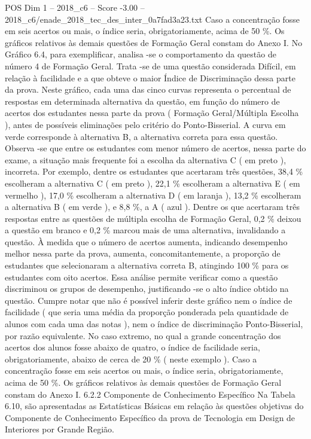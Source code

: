 \begin{textsample}{POS Dim 1 – 2018\_c6 – Score -3.00 – 2018\_c6/enade\_2018\_tec\_des\_inter\_0a7fad3a23.txt}
Caso a concentração fosse em seis acertos ou mais, o índice seria, obrigatoriamente, acima de 50 \%.
Os gráficos relativos às demais questões de Formação Geral constam do Anexo I.
No Gráfico 6.4, para exemplificar, analisa -se o comportamento da questão de número 4 de Formação Geral.
Trata -se de uma questão considerada Difícil, em relação à facilidade e a que obteve o maior Índice de Discriminação dessa parte da prova.
Neste gráfico, cada uma das cinco curvas representa o percentual de respostas em determinada alternativa da questão, em função do número de acertos dos estudantes nessa parte da prova ( Formação Geral/Múltipla Escolha ), antes de possíveis eliminações pelo critério do Ponto-Bisserial.
A curva em verde corresponde à alternativa B, a alternativa correta para essa questão.
Observa -se que entre os estudantes com menor número de acertos, nessa parte do exame, a situação mais frequente foi a escolha da alternativa C ( em preto ), incorreta.
Por exemplo, dentre os estudantes que acertaram três questões, 38,4 \% escolheram a alternativa C ( em preto ), 22,1 \% escolheram a alternativa E ( em vermelho ), 17,0 \% escolheram a alternativa D ( em laranja ), 13,2 \% escolheram a alternativa B ( em verde ), e 8,8 \%, a A ( azul ).
Dentre os que acertaram três respostas entre as questões de múltipla escolha de Formação Geral, 0,2 \% deixou a questão em branco e 0,2 \% marcou mais de uma alternativa, invalidando a questão.
À medida que o número de acertos aumenta, indicando desempenho melhor nessa parte da prova, aumenta, concomitantemente, a proporção de estudantes que selecionaram a alternativa correta B, atingindo 100 \% para os estudantes com oito acertos.
Essa análise permite verificar como a questão discriminou os grupos de desempenho, justificando -se o alto índice obtido na questão.
Cumpre notar que não é possível inferir deste gráfico nem o índice de facilidade ( que seria uma média da proporção ponderada pela quantidade de alunos com cada uma das notas ), nem o índice de discriminação Ponto-Bisserial, por razão equivalente.
No caso extremo, no qual a grande concentração dos acertos dos alunos fosse abaixo de quatro, o índice de facilidade seria, obrigatoriamente, abaixo de cerca de 20 \% ( neste exemplo ).
Caso a concentração fosse em seis acertos ou mais, o índice seria, obrigatoriamente, acima de 50 \%.
Os gráficos relativos às demais questões de Formação Geral constam do Anexo I. 6.2.2 Componente de Conhecimento Específico Na Tabela 6.10, são apresentadas as Estatísticas Básicas em relação às questões objetivas do Componente de Conhecimento Específico da prova de Tecnologia em Design de Interiores por Grande Região.

\end{textsample}
